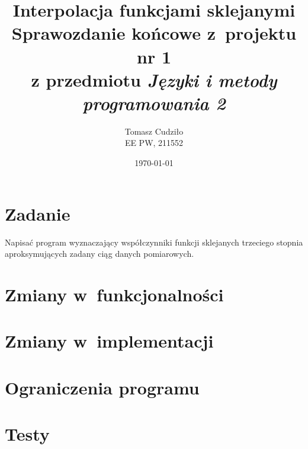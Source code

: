 \documentclass[10pt,a4paper]{article}
\begin{document}
\title{ 
  Interpolacja funkcjami sklejanymi\\
  {\normalsize Sprawozdanie końcowe z~projektu nr 1}\\\vspace{-12pt}
  {\normalsize z przedmiotu \emph{Języki i metody programowania 2}}
}
\author{
  Tomasz Cudziło\\
  {\small EE PW, 211552}
}
\date{\today}
\maketitle

\section*{Zadanie}
\label{sec:zadanie}

Napisać program wyznaczający współczynniki funkcji sklejanych trzeciego stopnia
aproksymujących zadany ciąg danych pomiarowych.

\vspace{24pt}

\section{Zmiany w~funkcjonalności}

\section{Zmiany w~implementacji}

\section{Ograniczenia programu}

\section{Testy}
\end{document}
